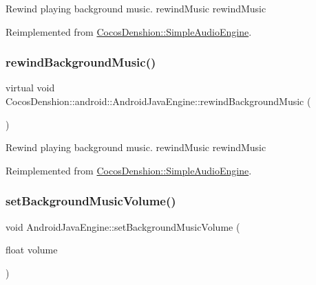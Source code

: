 Rewind playing background music.  rewind\+Music  rewind\+Music 

Reimplemented from \hyperlink{classCocosDenshion_1_1SimpleAudioEngine_ab91dfde414f3ef20ccd891e59ba5a67d}{Cocos\+Denshion\+::\+Simple\+Audio\+Engine}.

\mbox{\label{classCocosDenshion_1_1android_1_1AndroidJavaEngine_a65e37b788d03eff041fcb72754c2ed23}} 
\subsubsection{\texorpdfstring{rewind\+Background\+Music()}{rewindBackgroundMusic()}\hspace{0.1cm}{\footnotesize\ttfamily [2/2]}}
{\footnotesize\ttfamily virtual void Cocos\+Denshion\+::android\+::\+Android\+Java\+Engine\+::rewind\+Background\+Music (\begin{DoxyParamCaption}{ }\end{DoxyParamCaption})\hspace{0.3cm}{\ttfamily [virtual]}}

Rewind playing background music.  rewind\+Music  rewind\+Music 

Reimplemented from \hyperlink{classCocosDenshion_1_1SimpleAudioEngine_ab91dfde414f3ef20ccd891e59ba5a67d}{Cocos\+Denshion\+::\+Simple\+Audio\+Engine}.

\mbox{\label{classCocosDenshion_1_1android_1_1AndroidJavaEngine_a98d2ffd728746eacce6f4471c1bd68a7}} 
\subsubsection{\texorpdfstring{set\+Background\+Music\+Volume()}{setBackgroundMusicVolume()}\hspace{0.1cm}{\footnotesize\ttfamily [1/2]}}
{\footnotesize\ttfamily void Android\+Java\+Engine\+::set\+Background\+Music\+Volume (\begin{DoxyParamCaption}\item[{float}]{volume }\end{DoxyParamCaption})\hspace{0.3cm}{\ttfamily [virtual]}}

